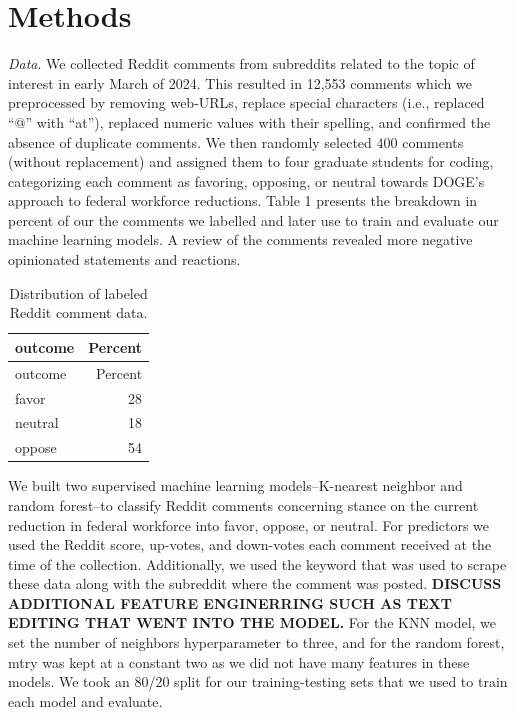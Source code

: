 \documentclass[
  12pt]{article}
\begin{document}
\section{Methods}\label{sec-meth}

\emph{Data}. We collected Reddit comments from subreddits related to the
topic of interest in early March of 2024. This resulted in 12,553
comments which we preprocessed by removing web-URLs, replace special
characters (i.e., replaced ``@'' with ``at''), replaced numeric values
with their spelling, and confirmed the absence of duplicate comments. We
then randomly selected 400 comments (without replacement) and assigned
them to four graduate students for coding, categorizing each comment as
favoring, opposing, or neutral towards DOGE's approach to federal
workforce reductions. Table 1 presents the breakdown in percent of our
the comments we labelled and later use to train and evaluate our machine
learning models. A review of the comments revealed more negative
opinionated statements and reactions.

\begin{longtable}[]{@{}lr@{}}
\caption{Distribution of labeled Reddit comment data.}\tabularnewline
\toprule\noalign{}
outcome & Percent \\
\midrule\noalign{}
\endfirsthead
\toprule\noalign{}
outcome & Percent \\
\midrule\noalign{}
\endhead
\bottomrule\noalign{}
\endlastfoot
favor & 28 \\
neutral & 18 \\
oppose & 54 \\
\end{longtable}

We built two supervised machine learning models--K-nearest neighbor and
random forest--to classify Reddit comments concerning stance on the
current reduction in federal workforce into favor, oppose, or neutral.
For predictors we used the Reddit score, up-votes, and down-votes each
comment received at the time of the collection. Additionally, we used
the keyword that was used to scrape these data along with the subreddit
where the comment was posted. \textbf{DISCUSS ADDITIONAL FEATURE
ENGINERRING SUCH AS TEXT EDITING THAT WENT INTO THE MODEL.} For the KNN
model, we set the number of neighbors hyperparameter to three, and for
the random forest, mtry was kept at a constant two as we did not have
many features in these models. We took an 80/20 split for our
training-testing sets that we used to train each model and evaluate.
\end{document}
